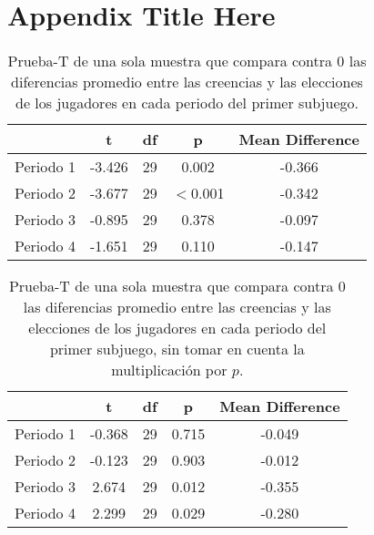 
\chapter{Appendix Title Here} %

\label{AppendixX} %

\begin{table}
\caption[Diferencias Normalizadas en el Subjuego 1]{Prueba-T de una sola muestra que compara contra 0 las diferencias promedio entre las creencias y las elecciones de los jugadores en cada periodo del primer subjuego.}
\label{DN_Sub1}
\centering
\begin{tabular}{l | c c c c}  %
\toprule
\textbf{} & \textbf{t} & \textbf{df} & \textbf{p} & \textbf{Mean Difference}\\
\midrule
Periodo 1 & -3.426 & 29 & 0.002 & -0.366 \\
Periodo 2 & -3.677 & 29 & $<$0.001 & -0.342 \\
Periodo 3 & -0.895 & 29 & 0.378 & -0.097 \\
Periodo 4 & -1.651 & 29 & 0.110 & -0.147 \\
\bottomrule
\end{tabular}
\end{table}


\begin{table}
\caption[Diferencias Normalizadas en el Subjuego 1, omitiendo la multiplicación $\cdot p$]{Prueba-T de una sola muestra que compara contra 0 las diferencias promedio entre las creencias y las elecciones de los jugadores en cada periodo del primer subjuego, sin tomar en cuenta la multiplicación por $p$.}
\label{DN_Sub1}
\centering
\begin{tabular}{l | c c c c}  %
\toprule
\textbf{} & \textbf{t} & \textbf{df} & \textbf{p} & \textbf{Mean Difference}\\
\midrule
Periodo 1 & -0.368 & 29 & 0.715 & -0.049 \\
Periodo 2 & -0.123 & 29 & 0.903 & -0.012 \\
Periodo 3 & 2.674 & 29 & 0.012 & -0.355 \\
Periodo 4 & 2.299 & 29 & 0.029 & -0.280 \\
\bottomrule
\end{tabular}
\end{table}

